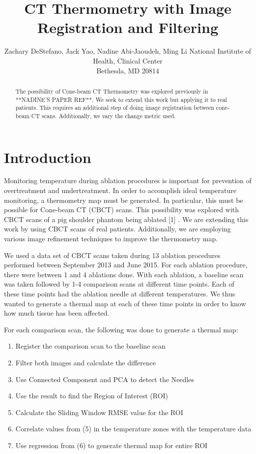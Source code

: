 \documentclass[]{spie}  %
\title{CT Thermometry with Image Registration and Filtering}
\author{Zachary DeStefano\supit{a}, Jack Yao\supit{a}, Nadine Abi-Jaoudeh\supit{a}, Ming Li\supit{a}
\skiplinehalf
\supit{a}National Institute of Health, Clinical Center\\Bethesda, MD 20814
}
\begin{document}
 
  \maketitle 

\begin{abstract}
The possibility of Cone-beam CT Thermometry was explored previously in **NADINE'S PAPER REF**. We seek to extend this work but applying it to real patients. This requires an additional step of doing image registration between cone-beam CT scans. Additionally, we vary the change metric used.  
\end{abstract}



\section{Introduction}
\label{sec:intro}  %

Monitoring temperature during ablation procedures is important for prevention of overtreatment and undertreatment. In order to accomplish ideal temperature monitoring, a thermometry map must be generated.  In particular, this must be possible for Cone-beam CT (CBCT) scans. This possibility was explored with CBCT scans of a pig shoulder phantom being ablated [1] . We are extending this work by using CBCT scans of real patients. Additionally, we are employing various image refinement techniques to improve the thermometry map. 

We used a data set of CBCT scans taken during 13 ablation procedures performed between September 2013 and June 2015. For each ablation procedure, there were between 1 and 4 ablations done. With each ablation, a baseline scan was taken followed by 1-4 comparison scans at different time points. Each of these time points had the ablation needle at different temperatures. We thus wanted to generate a thermal map at each of these time points in order to know how much tissue has been affected. 

For each comparison scan, the following was done to generate a thermal map:
\begin{enumerate}
\item Register the comparison scan to the baseline scan
\item Filter both images and calculate the difference
\item Use Connected Component and PCA to detect the Needles
\item Use the result to find the Region of Interest (ROI)
\item Calculate the Sliding Window RMSE value for the ROI
\item Correlate values from (5) in the temperature zones with the temperature data
\item Use regression from (6) to generate thermal map for entire ROI
\end{enumerate}
\end{document}
